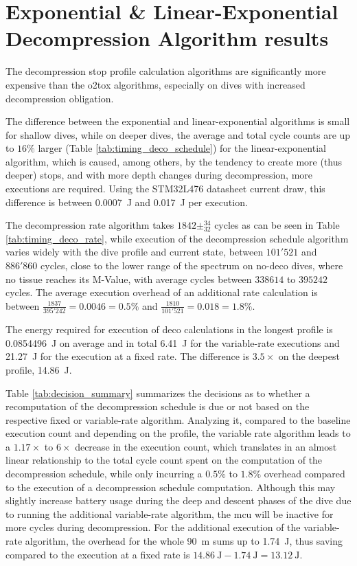\section{Exponential \& Linear-Exponential Decompression Algorithm results}
The decompression stop profile calculation algorithms are significantly more expensive than the \gls{o2tox} algorithms, especially on dives with increased decompression obligation.

The difference between the exponential and linear-exponential algorithms is small for shallow dives, while on deeper dives, the average and total cycle counts are up to $16\%$ larger (Table \ref{tab:timing_deco_schedule}) for the linear-exponential algorithm, which is caused, among others, by the tendency to create more (thus deeper) stops, and with more depth changes during decompression, more executions are required.
Using the STM32L476 datasheet current draw, this difference is between \SI{0.0007}{\joule} and \SI{0.017}{\joule} per execution.


The decompression rate algorithm takes $1842 \pm^{34}_{32}$ cycles as can be seen in Table \ref{tab:timing_deco_rate}, while execution of the decompression schedule algorithm varies widely with the dive profile and current state, between $101'521$ and $886'860$ cycles, close to the lower range of the spectrum on no-deco dives, where no tissue reaches its M-Value, with average cycles between $338614$ to $395242$ cycles.
The average execution overhead of an additional rate calculation is between $\frac{1837}{395'242} = 0.0046 = 0.5\%$ and $\frac{1810}{101'521} = 0.018 = 1.8\%$.

The energy required for execution of deco calculations in the longest profile is \SI{0.0854496}{\joule} on average and in total \SI{6.41}{\joule} for the variable-rate executions and \SI{21.27}{\joule} for the execution at a fixed rate. The difference is $3.5\times$ on the deepest profile, \SI{14.86}{\joule}.


Table \ref{tab:decision_summary} summarizes the decisions as to whether a recomputation of the decompression schedule is due or not based on the respective fixed or variable-rate algorithm. 
Analyzing it, compared to the baseline execution count and depending on the profile, the variable rate algorithm leads to a $1.17\times$ to $6\times$ decrease in the execution count, which translates in an almost linear relationship to the total cycle count spent on the computation of the decompression schedule, while only incurring a $0.5\%$ to $1.8\%$ overhead compared to the execution of a decompression schedule computation.
Although this may slightly increase battery usage during the deep and descent phases of the dive due to running the additional variable-rate algorithm, the \gls{mcu} will be inactive for more cycles during decompression. 
For the additional execution of the variable-rate algorithm, the overhead for the whole \SI{90}{\meter} sums up to \SI{1.74}{\joule}, thus saving compared to the execution at a fixed rate is $\SI{14.86}{\joule} - \SI{1.74}{\joule} = \SI{13.12}{\joule}$.

